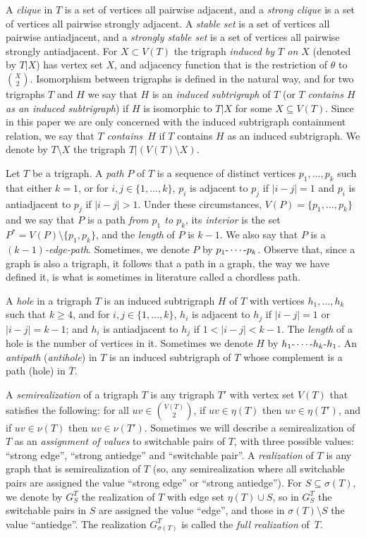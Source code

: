 \documentclass[11 pt] {article}
\def\d{\hbox{-}}
\def\c{\hbox{-}\cdots\hbox{-}}
\begin{document}
A {\em clique} in $T$ is a set of vertices all pairwise adjacent, and
a {\em strong clique} is a set of vertices all pairwise strongly
adjacent. A {\em stable set} is a set of vertices all pairwise
antiadjacent, and a {\em strongly stable set} is a set of vertices all
pairwise strongly antiadjacent. For $X \subset V(T)$ the trigraph
{\em induced by $T$ on $X$} (denoted by $T|X$) has vertex set $X$,
and adjacency function that is the restriction of $\theta$ to $X
\choose 2$. Isomorphism between trigraphs is defined in the natural
way, and for two trigraphs $T$ and $H$ we say that $H$ is an {\em
 induced subtrigraph} of $T$ (or $T$ {\em contains $H$ as an induced
 subtrigraph}) if $H$ is isomorphic to $T|X$ for some $X \subseteq
V(T)$. Since in this paper we are only concerned with the induced subtrigraph
containment relation, we say that \emph{$T$ contains~$H$} if $T$
contains $H$ as an induced subtrigraph. We denote by $T\setminus X$
the trigraph $T|(V(T) \setminus X)$.


Let $T$ be a trigraph. A \emph{path} $P$ of $T$ is a sequence of
distinct vertices $p_1, \dots, p_k$ such that either $k=1$, or for $i,
j \in \{1, \ldots, k\}$, $p_i$ is adjacent to $p_j$ if $|i-j|=1$ and
$p_i$ is antiadjacent to $p_j$ if $|i-j|>1$. Under these
circumstances, $V(P) = \{p_1, \dots, p_k\}$ and we say that $P$ is a
path {\em from $p_1$ to $p_k$}, its {\em interior} is the set
$P^*=V(P) \setminus \{p_1,p_k\}$, and the {\em length} of $P$ is
$k-1$. We also say that $P$ is a \emph{$(k-1)$-edge-path}. Sometimes,
we denote $P$ by $p_1 \c p_k$.  Observe that, since a graph is also a
trigraph, it follows that a path in a graph, the way we have defined
it, is what is sometimes in literature called a chordless path.


A {\em hole} in a trigraph $T$ is an induced subtrigraph $H$ of $T$
with vertices $h_1, \ldots, h_k $ such that $k \geq 4$, and for $i,j
\in \{1, \ldots, k\}$, $h_i$ is adjacent to $h_j$ if $|i-j|=1$ or
$|i-j|=k-1$; and $h_i$ is antiadjacent to $h_j$ if $1<|i-j|<k-1$. The
{\em length} of a hole is the number of vertices in it. Sometimes we
denote $H$ by $h_1 \c h_k \d h_1$. An {\em antipath} ({\em antihole})
in $T$ is an induced subtrigraph of $T$ whose complement is a path
(hole) in $\overline{T}$.


A {\em semirealization} of a trigraph $T$ is any trigraph $T'$ with
vertex set $V(T)$ that satisfies the following: for all $uv \in
{{V(T)} \choose 2}$, if $uv \in \eta(T)$ then $uv \in \eta(T')$, and
if $uv \in \nu(T)$ then $uv \in \nu(T')$.  Sometimes we will describe
a semirealization of $T$ as an {\em assignment of values} to
switchable pairs of $T$, with three possible values: ``strong edge'',
``strong antiedge'' and ``switchable pair''.  A {\em realization} of
$T$ is any graph that is semirealization of $T$ (so, any
semirealization where all switchable pairs are assigned the value
``strong edge'' or ``strong antiedge'').  For $S \subseteq \sigma
(T)$, we denote by $G^T_S$ the realization of $T$ with edge set $\eta
(T) \cup S$,  so in $G_{S}^T$ the switchable pairs in $S$ are assigned
the value ``edge'', and those in $\sigma(T) \setminus S$ the value
``antiedge''. The realization $G^T_{\sigma(T)}$ is called the {\em
  full realization} of~$T$.
\end{document}
